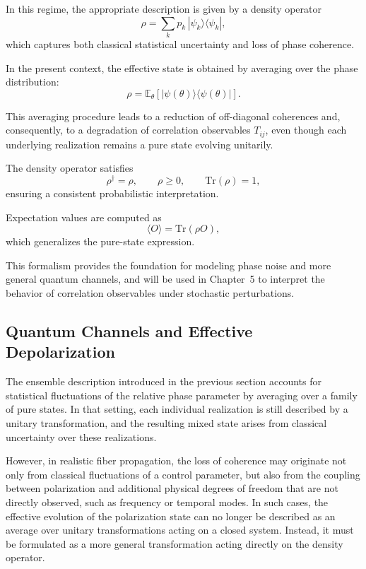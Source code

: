 \documentclass[a4paper]{article}
\begin{document}
In this regime, the appropriate description is given by a density operator
\[
\rho = \sum_k p_k \, |\psi_k\rangle\langle \psi_k|,
\]
which captures both classical statistical uncertainty and loss of phase coherence.

\medskip

In the present context, the effective state is obtained by averaging over the phase distribution:
\[
\rho = \mathbb{E}_{\theta}\left[ |\psi(\theta)\rangle\langle \psi(\theta)| \right].
\]

This averaging procedure leads to a reduction of off-diagonal coherences and, consequently, to a degradation of correlation observables \(T_{ij}\), even though each underlying realization remains a pure state evolving unitarily.

\medskip

The density operator satisfies
\[
\rho^\dagger = \rho, 
\qquad
\rho \ge 0, 
\qquad
\mathrm{Tr}(\rho) = 1,
\]
ensuring a consistent probabilistic interpretation.

\medskip

Expectation values are computed as
\[
\langle O \rangle = \mathrm{Tr}(\rho O),
\]
which generalizes the pure-state expression.

\medskip

This formalism provides the foundation for modeling phase noise and more general quantum channels, and will be used in Chapter~5 to interpret the behavior of correlation observables under stochastic perturbations.

\subsection{Quantum Channels and Effective Depolarization}

The ensemble description introduced in the previous section accounts for statistical fluctuations of the relative phase parameter by averaging over a family of pure states. In that setting, each individual realization is still described by a unitary transformation, and the resulting mixed state arises from classical uncertainty over these realizations.

However, in realistic fiber propagation, the loss of coherence may originate not only from classical fluctuations of a control parameter, but also from the coupling between polarization and additional physical degrees of freedom that are not directly observed, such as frequency or temporal modes. In such cases, the effective evolution of the polarization state can no longer be described as an average over unitary transformations acting on a closed system. Instead, it must be formulated as a more general transformation acting directly on the density operator.
\end{document}
